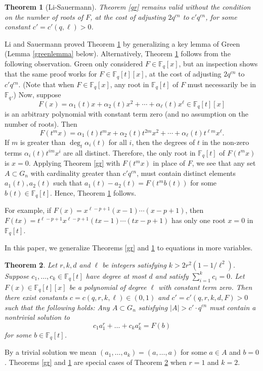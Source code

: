 \documentclass[11pt]{amsart}
\newcommand\Fq{{\mathbb{F}_q}}
\newtheorem{theorem}{Theorem}%
\theoremstyle{definition}
\theoremstyle{remark}
\begin{document}
\begin{theorem}[Li-Sauermann] \label{th:ls}
Theorem \ref{gr} remains valid without the condition on the number of roots of $F$, at the cost of adjusting $2 q^{cn}$ to $c' q^{cn}$, for some constant $c' = c'(q, \ell)>0$.
\end{theorem}

Li and Sauermann proved Theorem \ref{th:ls} by generalizing a key lemma of Green (Lemma \ref{greenlemma} below). Alternatively, Theorem \ref{th:ls} follows from the following  observation. Green only considered $F \in \Fq[x]$, but an inspection shows that the same proof works for $F\in \Fq[t][x]$, at the cost of adjusting $2q^{cn}$ to $c'q^{cn}$. (Note that when $F \in \Fq[x]$, any root in $\Fq[t]$ of $F$ must necessarily be in $\Fq$.)
Now, suppose 
\[
F(x) = \alpha_1(t) x + \alpha_2(t) x^2 + \cdots + \alpha_\ell(t) x^\ell \in \Fq[t][x]
\]
is an arbitrary polynomial with constant term zero (and no assumption on the number of roots). Then 
\[
F(t^m x) = \alpha_1(t) t^m x + \alpha_2(t) t^{2m} x^2 + \cdots + \alpha_\ell(t) t^{\ell m} x^\ell.
\]
If $m$ is greater than $\deg_t \alpha_i(t)$ for all $i$, then the degrees of $t$ in the non-zero terms $\alpha_i(t) t^{im} x^i$ are all distinct. Therefore, the only root in $\Fq[t]$ of $F(t^m x)$ is $x = 0$. Applying Theorem \ref{gr} with $F(t^m x)$ in place of $F$, we see that any set $A \subset G_n$ with cardinality greater than $c' q^{cn}$, must contain distinct elements $a_1(t), a_2(t)$ such that $a_1(t)-a_2(t) = F(t^m b(t))$ for some $b(t)\in \Fq[t]$. Hence, Theorem \ref{th:ls} follows.

For example, if $F(x) = x^{\ell-p+1}(x-1)\cdots(x-p+1)$, then $F(tx) = t^{\ell-p+1} x^{\ell-p+1}(tx-1)\cdots(tx-p+1)$ has only one root $x=0$ in $\Fq[t]$.

In this paper, we generalize Theorems \ref{gr} and \ref{th:ls} to equations in more variables.

\begin{theorem}\label{thmA}
	Let $r, k, d$ and $\ell$ be integers satisfying $k>2r^2 (1-1/\ell^2)$. Suppose $c_1,\dots , c_k\in \Fq[t]$ have degree at most $d$ and satisfy $\sum_{i=1}^{k}c_i=0$. Let $F(x) \in \Fq[t][x]$ be a polynomial of degree $\ell$ with constant term zero. 
 Then there exist constants $c = c(q,r, k ,\ell) \in (0,1)$ and $c'=c'(q,r,k,d,F)>0$ such that the following holds: Any $A\subset G_n$ satisfying $|A|> c' \cdot q^{cn} $ must contain a nontrivial solution to 
	\begin{equation}\label{ee}
		c_1 a_1^r+\dots +c_k a_k^r=F(b)
	\end{equation}
	for some $b\in \Fq[t]$.
\end{theorem}
By a trivial solution we mean $(a_1,\dots,a_k)=(a,\dots,a)$ for some $a\in A$ and $b=0$. Theorems \ref{gr} and \ref{th:ls} are special cases of Theorem \ref{thmA} when $r=1$ and $k=2$.
\end{document}
